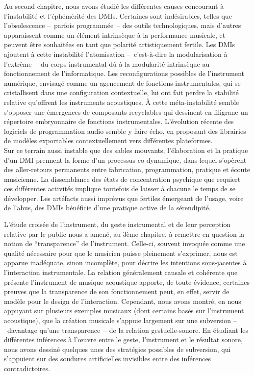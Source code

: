\noindent Au second chapitre, nous avons étudié les différentes causes concourant à l'instabilité et l'éphémérité des \glspl{DMI}. Certaines sont indésirables, telles que l'obsolescence --~parfois programmée~-- des outils technologiques, mais d'autres apparaissent comme un élément intrinsèque à la performance musicale, et peuvent être souhaitées en tant que polarité artistiquement fertile. Les \glspl{DMI} ajoutent à cette instabilité l'atomisation --~c'est-à-dire la modularisation à l'extrême~-- du corps instrumental dû à la modularité intrinsèque au fonctionnement de l'informatique. Les reconfigurations possibles de l'instrument numérique, envisagé comme un agencement de fonctions instrumentales, qui se cristallisent dans une configuration contextuelle, lui ont fait perdre la stabilité relative qu'offrent les instruments acoustiques. À cette méta-instabilité semble s'opposer une émergences de composants recyclables qui dessinent en filigrane un répertoire embryonnaire de fonctions instrumentales. L'évolution récente des logiciels de programmation audio semble y faire écho, en proposant des librairies de modèles exportables contextuellement vers différentes plateformes.\\
\indent Sur ce terrain aussi instable que des sables mouvants, l'élaboration et la pratique d'un \gls{DMI} prennent la forme d'un processus co-dynamique, dans lequel s'opèrent des aller-retours permanents entre fabrication, programmation, pratique et écoute musicienne. La dissemblance des états de concentration psychique que requiert ces différentes activités implique toutefois de laisser à chacune le temps de se développer. Les artéfacts aussi imprévus que fertiles émergeant de l'usage, voire de l'abus, des \glspl{DMI} bénéficie d'une pratique active de la sérendipité.

\noindent L'étude croisée de l'instrument, du geste instrumental et de leur perception relative par le public nous a amené, au 3ème chapitre, à remettre en question la notion de ``transparence'' de l'instrument. Celle-ci, souvent invoquée comme une qualité nécessaire pour que le musicien puisse pleinement s'exprimer, nous est apparue inadéquate, sinon incomplète, pour décrire les intentions sous-jacentes à l'interaction instrumentale. La relation généralement causale et cohérente que présente l'instrument de musique acoustique apporte, de toute évidence, certaines preuves que la transparence de son fonctionnement peut, en effet, servir de modèle pour le design de l'interaction. Cependant, nous avons montré, en nous appuyant sur plusieurs exemples musicaux (dont certains basés sur l'instrument acoustique), que la création musicale s'appuie largement sur une subversion --~davantage qu'une transparence~-- de la relation gestuelle-sonore. En étudiant les différentes inférences à l'œuvre entre le geste, l'instrument et le résultat sonore, nous avons dessiné quelques unes des stratégies possibles de subversion, qui s'appuient sur des soudures artificielles invisibles entre des inférences contradictoires.

